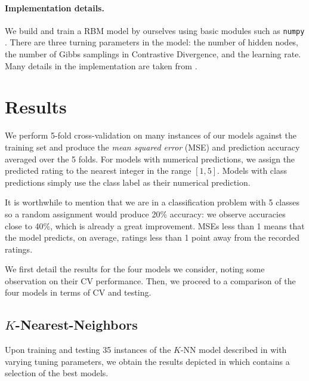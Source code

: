 \documentclass[bj, preprint]{imsart}
\begin{document}
\paragraph{Implementation details.}\label{par:method.models.rbm.impl}

We build and train a RBM model by ourselves using basic modules such as \texttt{numpy} \citep{numpy2011}. There are three turning parameters in the model: the number of hidden nodes, the number of Gibbs samplings in Contrastive Divergence, and the learning rate. Many details in the implementation are taken from \cite{hinton2012practical}.


\section{Results}\label{sec:results}

We perform 5-fold cross-validation on many instances of our models against the training set and produce the \textit{mean squared error} (MSE) and prediction accuracy averaged over the 5 folds. For models with numerical predictions, we assign the predicted rating to the nearest integer in the range $[1,5]$.  Models with class predictions simply use the class label as their numerical prediction. 

It is worthwhile to mention that we are in a classification problem with 5 classes so a random assignment would produce 20\% accuracy: we observe accuracies close to 40\%, which is already a great improvement. MSEs less than 1 means that the model predicts, on average, ratings less than 1 point away from the recorded ratings.

We first detail the results for the four models we consider, noting some observation on their CV performance. Then, we proceed to a comparison of the four models in terms of CV and testing.

\subsection{$K$-Nearest-Neighbors}\label{sebsec:results.knn}

Upon training and testing 35 instances of the $K$-NN model described in  with varying tuning parameters, we obtain the results depicted in  which contains a selection of the best models.
\end{document}
